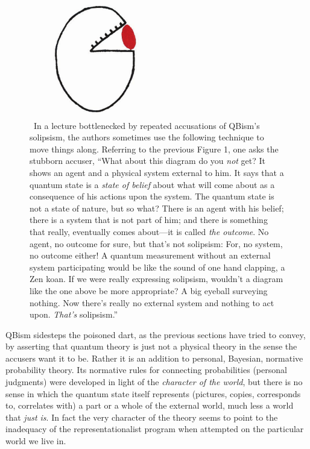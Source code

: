 \documentclass[aps,pra,superscriptaddress,10pt,tightenlines,twocolumn,nofootinbib]{revtex4}
\begin{document}
\begin{figure}
\begin{center}
\includegraphics[height=2.0in]{sarcasm3}
\bigskip\caption{~In a lecture bottlenecked by repeated accusations of QBism's solipsism, the authors sometimes use the following technique to move things along. Referring to the previous Figure 1, one asks the stubborn accuser, ``What about this diagram do you {\it not\/} get?  It shows an agent and a physical system external to him.  It says that a quantum state is a {\it state of belief\/} about what will come about as a consequence of his actions upon the system.   The quantum state is not a state of nature, but so what?  There is an agent with his belief; there is a system that is not part of him; and there is something that really, eventually comes about---it is called {\it the outcome}.  No agent, no outcome for sure, but that's not solipsism:  For, no system, no outcome either!  A quantum measurement without an external system participating would be like the sound of one hand clapping, a Zen koan.  If we were really expressing solipsism, wouldn't a diagram like the one above be more appropriate?  A big eyeball surveying nothing.  Now there's really no external system and nothing to act upon. {\it That's\/} solipsism.''}
\label{AllForNorsen}
\end{center}
\end{figure}

QBism sidesteps the poisoned dart, as the previous sections have tried to convey, by asserting that quantum theory is just not a physical theory in the sense the accusers want it to be.  Rather it is an addition to personal, Bayesian, normative probability theory.  Its normative rules for connecting probabilities (personal judgments) were developed in light of the {\it character of the world}, but there is no sense in which the quantum state itself represents (pictures, copies, corresponds to, correlates with) a part or a whole of the external world, much less a world that {\it just is}.  In fact the very character of the theory seems to point to the inadequacy of the representationalist program when attempted on the particular world we live in.
\end{document}
